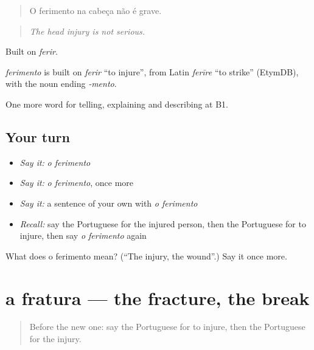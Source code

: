 \begin{quote}
O ferimento na cabeça não é grave.
\end{quote}

\begin{quote}
\emph{The head injury is not serious.}
\end{quote}

Built on \emph{ferir}.

\begin{cousinweb}
\emph{ferimento} is built on \emph{ferir} \textquotedblleft{}to injure\textquotedblright{}, from Latin \emph{ferīre} \textquotedblleft{}to strike\textquotedblright{} (EtymDB), with the noun ending \emph{-mento}.
\end{cousinweb}

\begin{grammarlens}[title={What you've built}]
One more word for telling, explaining and describing at B1.
\end{grammarlens}

\subsection*{Your turn}
\begin{itemize}
\raggedright
  \item \emph{Say it:} \emph{o ferimento}
  \item \emph{Say it:} \emph{o ferimento}, once more
  \item \emph{Say it:} a sentence of your own with \emph{o ferimento}
  \item \emph{Recall:} say the Portuguese for the injured person, then the Portuguese for to injure, then say \emph{o ferimento} again
\end{itemize}

\begin{tcolorbox}[breakable,colback=teal!4,colframe=teal!35!black,title={Before you move on}]
What does o ferimento mean? (\textquotedblleft{}The injury, the wound\textquotedblright{}.) Say it once more.
\end{tcolorbox}
\section[a fratura]{a fratura — the fracture, the break}

\label{lesson:PT-C307-fratura}



\begin{quote}
Before the new one: say the Portuguese for to injure, then the Portuguese for the injury.
\end{quote}

